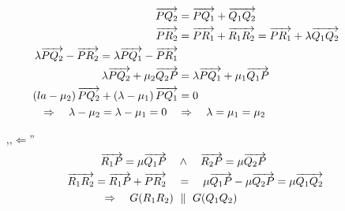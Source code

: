 \begin{mysatz}
\begin{minipage}{0.4\textwidth}
    \end{minipage}
    \begin{align*}
        \overrightarrow{PQ_2} & = \overrightarrow{PQ_1} + \overrightarrow{Q_1 Q_2}\\
        \overrightarrow{PR_2} & = \overrightarrow{PR_1} + \overrightarrow{R_1 R_2} = \overrightarrow{PR_1} + \lambda \overrightarrow{Q_1 Q_2}\\
        \lambda \overrightarrow{PQ_2} - \overrightarrow{PR_2} = \lambda \overrightarrow{PQ_1} - \overrightarrow{PR_1}\\
        \lambda \overrightarrow{PQ_2} + \mu_2 \overrightarrow{Q_2 P} & = \lambda \overrightarrow{PQ_1} + \mu_1 \overrightarrow{Q_1 P}\\
        \left( la - \mu_2 \right) \overrightarrow{PQ_2} + \left( \lambda - \mu_1 \right) \overrightarrow{PQ_1} & = 0\\
        \Rightarrow \quad \lambda - \mu_2 = \lambda - \mu_1 = 0 \quad & \Rightarrow \quad \lambda = \mu_1 = \mu_2\\
    \end{align*}
    \begin{itemize}
        \item[,,$\Leftarrow$'']
            \begin{align*}
                \overrightarrow{R_1 P} = \mu \overrightarrow{Q_1 P} \quad & \wedge \quad \overrightarrow{R_2 P} = \mu \overrightarrow{Q_2 P}\\
                \overrightarrow{R_1 R_2} = \overrightarrow{R_1 P} + \overrightarrow{PR_2} \quad & = \quad \mu \overrightarrow{Q_1 P} - \mu \overrightarrow{Q_2 P} = \mu \overrightarrow{Q_1 Q_2}\\
                \Rightarrow \quad G(R_1 R_2) \ & \parallel \ G(Q_1 Q_2)
            \end{align*}
    \end{itemize}
\end{mysatz}


